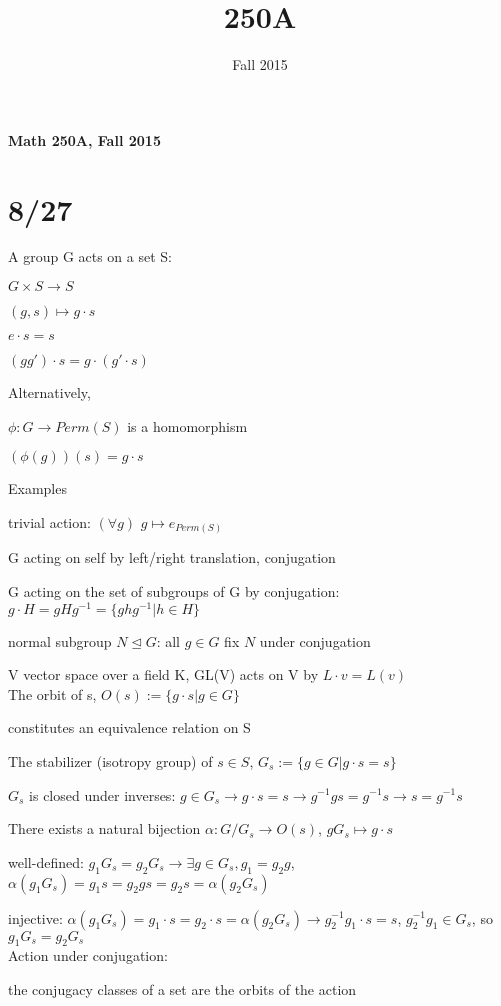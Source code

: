 \documentclass[12pt]{article}
\title{\normalsizMath 250A}
\date{\normalsize Fall 2015}
\begin{document}
\noindent
\textbf{Math 250A, Fall 2015}

\section{8/27}

\noindent
A group G acts on a set S:

$G \times S \to S$

$(g, s) \mapsto g \cdot s$

$e \cdot s = s$

$(g g') \cdot s = g \cdot (g' \cdot s)$

\noindent
Alternatively,

$\phi: G \to Perm(S)$ is a homomorphism

$(\phi(g))(s) = g \cdot s$

\noindent
Examples

trivial action: $(\forall g)$ $g \mapsto e_{Perm(S)}$

G acting on self by left/right translation, conjugation

G acting on the set of subgroups of G by conjugation: $g \cdot H = gHg^{-1} = \{ghg^{-1} | h \in H\}$

normal subgroup $N \trianglelefteq G$: all $g \in G$ fix $N$ under conjugation

V vector space over a field K, GL(V) acts on V by $L \cdot v = L(v)$\\

\noindent
The orbit of s, $O(s) := \{g \cdot s | g \in G\}$

constitutes an equivalence relation on S

\noindent
The stabilizer (isotropy group) of $s \in S$, $G_s := \{g \in G |g \cdot s = s\}$

$G_s$ is closed under inverses: $g \in G_s \to g \cdot s = s \to g^{-1}gs = g^{-1}s \to s = g^{-1}s$

\noindent
There exists a natural bijection $\alpha: G/G_s \to O(s)$, $gG_s \mapsto g \cdot s$

well-defined: $g_1G_s = g_2G_s \to \exists g \in G_s, g_1 = g_2g$, $\alpha(g_1G_s) = g_1s = g_2 g s = g_2 s = \alpha(g_2G_s)$

injective: $\alpha(g_1G_s) = g_1 \cdot s = g_2 \cdot s = \alpha(g_2G_s) \to g_2^{-1}g_1 \cdot s = s$, $g_2^{-1}g_1 \in G_s$, so $g_1G_s = g_2G_s$\\

\noindent
Action under conjugation:

the conjugacy classes of a set are the orbits of the action
\end{document}

